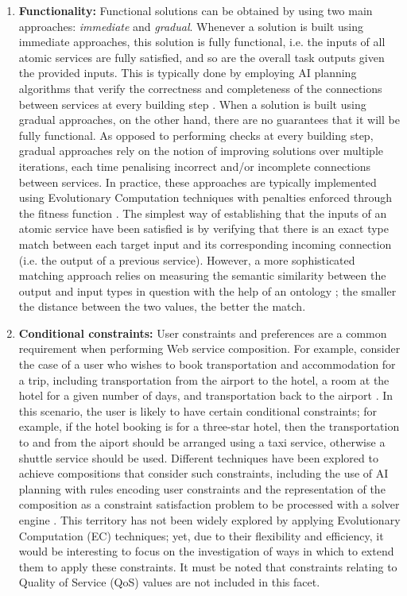 \begin{enumerate}
 \item \textbf{Functionality:} Functional solutions can be obtained by using two main approaches: \textit{immediate} and \textit{gradual}. Whenever a solution is built using immediate approaches, this solution is fully functional, i.e. the inputs of all atomic services are fully satisfied, and so are the overall task outputs given the provided inputs. This is typically done by employing AI planning algorithms that verify the correctness and completeness of the connections between services at every building step \cite{wang2014automated}. When a solution is built using gradual approaches, on the other hand, there are no guarantees that it will be fully functional. As opposed to performing checks at every building step, gradual approaches rely on the notion of improving solutions over multiple iterations, each time penalising incorrect and/or incomplete connections between services. In practice, these approaches are typically implemented using Evolutionary Computation techniques with penalties enforced through the fitness function \cite{rodriguez2010composition}. The simplest way of establishing that the inputs of an atomic service have been satisfied is by verifying that there is an exact type match between each target input and its corresponding incoming connection (i.e. the output of a previous service). However, a more sophisticated matching approach relies on measuring the semantic similarity between the output and input types in question with the help of an ontology \cite{DBLP:journals/soca/BoustilMS14}; the smaller the distance between the two values, the better the match.
 
 \item \textbf{Conditional constraints:}  User constraints and preferences are a common requirement when performing Web service composition. For example,
 consider the case of a user who wishes to book transportation and accommodation for a trip, including transportation
 from the airport to the hotel, a room at the hotel for a given number of days, and transportation back
 to the airport \cite{boustil2010web}. In this scenario, the user is likely to have certain conditional constraints; for example, if the hotel booking
 is for a three-star hotel, then the transportation to and from the aiport should be arranged using a taxi service, otherwise a shuttle service should
 be used. Different techniques have been explored to achieve compositions that consider such constraints, including the use of AI planning
 with rules encoding user constraints \cite{DBLP:journals/soca/BoustilMS14} and the representation of the composition
 as a constraint satisfaction problem to be processed with a solver engine \cite{karakoc2009composing}. This
 territory has not been widely explored by applying Evolutionary Computation (EC) techniques; yet, due to their flexibility and efficiency, it would be
 interesting to focus on the investigation of ways in which to extend them to apply these constraints. It must be noted
 that constraints relating to Quality of Service (QoS) values are not included in this facet.
 

\end{enumerate}
